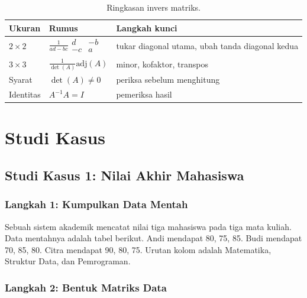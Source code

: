 \documentclass[11pt,a4paper]{article}
\begin{document}
\begin{table}[H]
	\centering
	\caption{Ringkasan invers matriks.}
	\label{tab:invers}
	\small
	\begin{tabularx}{\textwidth}{l X X}
		\toprule
		Ukuran       & Rumus                                                           & Langkah kunci                                   \\
		\midrule
		$2 \times 2$ & $\frac{1}{ad-bc}\begin{smallmatrix}d&-b\\-c&a\end{smallmatrix}$ & tukar diagonal utama, ubah tanda diagonal kedua \\
		$3 \times 3$ & $\frac{1}{\det(A)}\text{adj}(A)$                                & minor, kofaktor, transpos                       \\
		Syarat       & $\det(A) \ne 0$                                                 & periksa sebelum menghitung                      \\
		Identitas    & $A^{-1}A=I$                                                     & pemeriksa hasil                                 \\
		\bottomrule
	\end{tabularx}
\end{table}

\section{Studi Kasus}

\subsection{Studi Kasus 1: Nilai Akhir Mahasiswa}

\subsubsection{Langkah 1: Kumpulkan Data Mentah}

Sebuah sistem akademik mencatat nilai tiga mahasiswa pada tiga mata kuliah. Data mentahnya adalah tabel berikut. Andi mendapat 80, 75, 85. Budi mendapat 70, 85, 80. Citra mendapat 90, 80, 75. Urutan kolom adalah Matematika, Struktur Data, dan Pemrograman.

\subsubsection{Langkah 2: Bentuk Matriks Data}
\end{document}
